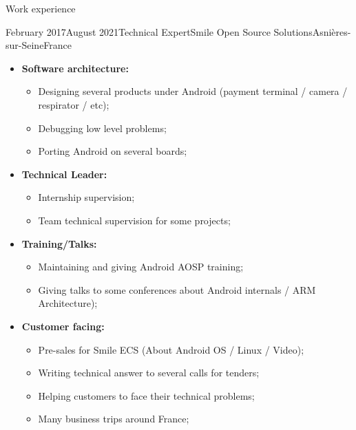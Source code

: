 \documentclass[a4paper, 10pt]{article}
\begin{document}
\begin{section} {Work experience}
    \begin{experience}{February 2017}{August 2021}{Technical Expert}{Smile Open Source Solutions}{Asni\`{e}res-sur-Seine}{France}
    \begin{subexperience}
    \begin{itemize}[parsep=0cm,itemsep=0cm,topsep=0cm]
		\item \textbf {Software architecture:}
		\begin{itemize}[parsep=0cm,itemsep=0cm,topsep=0cm]
			\item Designing several products under Android (payment terminal / camera / respirator / etc);
			\item Debugging low level problems;
			\item Porting Android on several boards;
		\end{itemize}
		\item \textbf {Technical Leader:}
		\begin{itemize}[parsep=0cm,itemsep=0cm,topsep=0cm]
			\item Internship supervision;
			\item Team technical supervision for some projects;
		\end{itemize}
		\item \textbf {Training/Talks:}
		\begin{itemize}[parsep=0cm,itemsep=0cm,topsep=0cm]
			\item Maintaining and giving Android AOSP training;
			\item Giving talks to some conferences about Android internals / ARM Architecture);
		\end{itemize}
		\item \textbf {Customer facing:}
		\begin{itemize}[parsep=0cm,itemsep=0cm,topsep=0cm]
			\item Pre-sales for Smile ECS (About Android OS / Linux / Video);
			\item Writing technical answer to several calls for tenders;
			\item Helping customers to face their technical problems;
			\item Many business trips around France;
		\end{itemize}
	\end{itemize}
	\end{subexperience}
	\end{experience}


\end{section}
\end{document}
